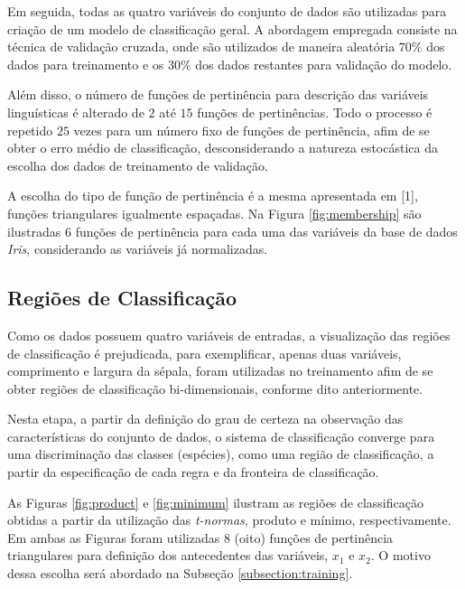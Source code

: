 \documentclass[12pt,a4paper]{article}
\numberwithin{equation}{section}
\begin{document}
Em seguida, todas as quatro variáveis do conjunto de dados são utilizadas para criação de um modelo de classificação geral. A abordagem empregada consiste na técnica de validação cruzada, onde são utilizados de maneira aleatória $70\%$ dos dados para treinamento e os $30\%$ dos dados restantes para validação do modelo.

Além disso, o número de funções de pertinência para descrição das variáveis linguísticas é alterado de $2$ até $15$ funções de pertinências. Todo o processo é repetido $25$ vezes para um número fixo de funções de pertinência, afim de se obter o erro médio de classificação, desconsiderando a natureza estocástica da escolha dos dados de treinamento de validação.

A escolha do tipo de função de pertinência é a mesma apresentada em [1], funções triangulares igualmente espaçadas. Na Figura \ref{fig:membership} são ilustradas $6$ funções de pertinência para cada uma das variáveis da base de dados \textit{Iris}, considerando as variáveis já normalizadas.

\subsection{Regiões de Classificação}

Como os dados possuem quatro variáveis de entradas, a visualização das regiões de classificação é prejudicada, para exemplificar, apenas duas variáveis, comprimento e largura da sépala, foram utilizadas no treinamento afim de se obter regiões de classificação bi-dimensionais, conforme dito anteriormente.

Nesta etapa, a partir da definição do grau de certeza na observação das características do conjunto de dados, o sistema de classificação converge para uma discriminação das classes (espécies), como uma região de classificação, a partir da especificação de cada regra e da fronteira de classificação.

As Figuras \ref{fig:product} e \ref{fig:minimum} ilustram as regiões de classificação obtidas a partir da utilização das \textit{t-normas}, produto e mínimo, respectivamente. Em ambas as Figuras foram utilizadas $8$ (oito) funções de pertinência triangulares para definição dos antecedentes das variáveis, $x_1$ e $x_2$. O motivo dessa escolha será abordado na Subseção \ref{subsection:training}.

\end{document}

